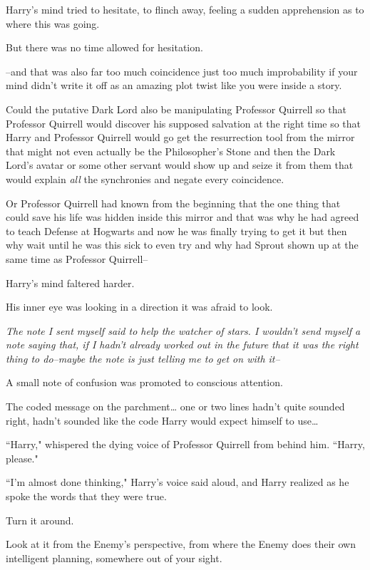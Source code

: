 Harry's mind tried to hesitate, to flinch away, feeling a sudden apprehension as to where this was going.

But there was no time allowed for hesitation.

\---and that was also far too much coincidence just too much improbability if your mind didn't write it off as an amazing plot twist like you were inside a story.

Could the putative Dark Lord also be manipulating Professor Quirrell so that Professor Quirrell would discover his supposed salvation at the right time so that Harry and Professor Quirrell would go get the resurrection tool from the mirror that might not even actually be the Philosopher's Stone and then the Dark Lord's avatar or some other servant would show up and seize it from them that would explain \emph{all} the synchronies and negate every coincidence.

Or Professor Quirrell had known from the beginning that the one thing that could save his life was hidden inside this mirror and that was why he had agreed to teach Defense at Hogwarts and now he was finally trying to get it but then why wait until he was this sick to even try and why had Sprout shown up at the same time as Professor Quirrell\---

Harry's mind faltered harder.

His inner eye was looking in a direction it was afraid to look.

\emph{The note I sent myself said to help the watcher of stars. I wouldn't send myself a note saying that, if I hadn't already worked out in the future that it was the right thing to do\---maybe the note is just telling me to get on with it\---}

A small note of confusion was promoted to conscious attention.

The coded message on the parchment{\ldots} one or two lines hadn't quite sounded right, hadn't sounded like the code Harry would expect himself to use{\ldots}

``Harry," whispered the dying voice of Professor Quirrell from behind him. ``Harry, please."

``I'm almost done thinking," Harry's voice said aloud, and Harry realized as he spoke the words that they were true.

Turn it around.

Look at it from the Enemy's perspective, from where the Enemy does their own intelligent planning, somewhere out of your sight.

